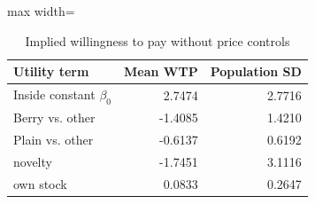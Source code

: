 \begin{table}[htbp]\centering\small
\caption{Implied willingness to pay without price controls}
\label{tab:wtp-demand}
\begin{adjustbox}{max width=\linewidth}
\begin{tabular}{lrr}\toprule
Utility term & Mean WTP & Population SD\\\midrule
Inside constant $\beta_0$ & 2.7474 & 2.7716 \\
Berry vs. other & -1.4085 & 1.4210 \\
Plain vs. other & -0.6137 & 0.6192 \\
novelty & -1.7451 & 3.1116 \\
own stock & 0.0833 & 0.2647 \\
\bottomrule\end{tabular}
\end{adjustbox}
\end{table}
